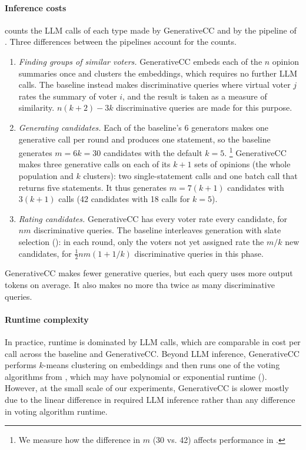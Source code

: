 \documentclass[letterpaper]{article} %
\begin{document}
\paragraph{Inference costs}
 counts the LLM calls of each type made by GenerativeCC and by the pipeline of \citet{fish-v2}.
Three differences between the pipelines account for the counts.
\begin{enumerate}
    \item \emph{Finding groups of similar voters.}
    GenerativeCC embeds each of the \(n\) opinion summaries once and clusters the embeddings, which requires no further LLM calls.
    The baseline instead makes discriminative queries where virtual voter \(j\) rates the summary of voter \(i\), and the result is taken as a measure of similarity.
    \(n(k+2)-3k\) discriminative queries are made for this purpose.
    \item \emph{Generating candidates.}
    Each of the baseline's 6 generators makes one generative call per round and produces one statement, so the baseline generates \(m=6k=30\) candidates with the default \(k=5\).
    \footnote{We measure how the difference in \(m\) (30 vs. 42) affects performance in .}
    GenerativeCC makes three generative calls on each of its \(k+1\) sets of opinions (the whole population and \(k\) clusters): two single-statement calls and one batch call that returns five statements.
    It thus generates \(m=7(k+1)\) candidates with \(3(k+1)\) calls (42 candidates with 18 calls for \(k=5\)).
    \item \emph{Rating candidates.}
    GenerativeCC has every voter rate every candidate, for \(nm\) discriminative queries.
    The baseline interleaves generation with slate selection (): in each round, only the voters not yet assigned rate the \(m/k\) new candidates, for \(\frac{1}{2} n m (1 + 1/k)\) discriminative queries in this phase.
\end{enumerate}

GenerativeCC makes fewer generative queries, but each query uses more output tokens on average.
It also makes no more tha twice as many discriminative queries.

\paragraph{Runtime complexity}
In practice, runtime is dominated by LLM calls, which are comparable in cost per call across the baseline and GenerativeCC.
Beyond LLM inference, GenerativeCC performs \(k\)-means clustering on embeddings and then runs one of the voting algorithms from , which may have polynomial or exponential runtime ().
However, at the small scale of our experiments, GenerativeCC is slower mostly due to the linear difference in required LLM inference rather than any difference in voting algorithm runtime.
\end{document}
